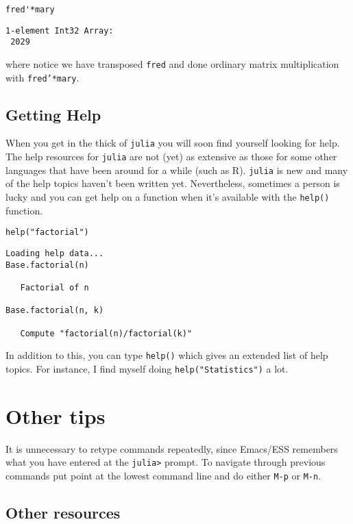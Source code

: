 \documentclass[11pt]{article}
\begin{document}
\begin{verbatim}
fred'*mary
\end{verbatim}

\begin{verbatim}
1-element Int32 Array:
 2029
\end{verbatim}

where notice we have transposed \texttt{fred} and done ordinary matrix
multiplication with \texttt{fred'*mary}.
\subsection[Getting Help]{Getting Help}
\label{sec-2-3}

When you get in the thick of \texttt{julia} you will soon find yourself
looking for help. The help resources for \texttt{julia} are not (yet) as
extensive as those for some other languages that have been around for
a while (such as R).  \texttt{julia} is new and many of the help topics
haven't been written yet.  Nevertheless, sometimes a person is lucky
and you can get help on a function when it's available with the
\texttt{help()} function.

\begin{verbatim}
help("factorial")
\end{verbatim}

\begin{verbatim}
Loading help data...
Base.factorial(n)

   Factorial of n

Base.factorial(n, k)

   Compute "factorial(n)/factorial(k)"
\end{verbatim}

In addition to this, you can type \texttt{help()} which gives an extended
list of help topics.  For instance, I find myself doing
\texttt{help("Statistics")} a lot.
\section[Other tips]{Other tips}
\label{sec-3}

It is unnecessary to retype commands repeatedly, since Emacs/ESS
remembers what you have entered at the \texttt{julia>} prompt. To navigate
through previous commands put point at the lowest command line and
do either \texttt{M-p} or \texttt{M-n}.

\subsection[Other resources]{Other resources}
\label{sec-3-1}
\end{document}
